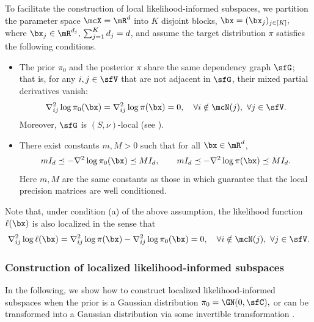 \documentclass[11pt]{article}
\begin{document}
\begin{asm}
\label{asm:LLIS}
To facilitate the construction of local likelihood-informed subspaces, we partition the parameter space $\mcX = \mR^d$ into $K$ disjoint blocks, $\bx = (\bx_j)_{j\in[K]},$ where $\bx_j \in \mR^{d_j},\, \sum_{j=1}^K d_j = d$,
and assume the target distribution $\pi$ satisfies the following conditions.
\begin{itemize}
    \item The prior $\pi_0$ and the posterior $\pi$ share the same dependency graph $\sfG$; that is, for any $i,j\in\sfV$ that are not adjacent in $\sfG$, their mixed partial derivatives vanish:
    \begin{equation}
        \nabla_{ij}^2 \log \pi_0 (\bx) = \nabla_{ij}^2 \log \pi (\bx) = 0, \quad \forall i \notin \mcN(j),~ \forall j \in \sfV.
    \end{equation}
    Moreover, $\sfG$ is $(S,\nu)$-local (see ).
    \item There exist constants $m,M > 0$ such that for all $\bx \in \mR^d$,
    \begin{equation}
        m I_d \preceq - \nabla^2 \log \pi_0(\bx) \preceq M I_d, \qquad m I_d \preceq - \nabla^2 \log \pi(\bx) \preceq M I_d.
    \end{equation}
    Here $m,M$ are the same constants as those in  which guarantee that the local precision matrices are well conditioned.
\end{itemize}
\end{asm}


Note that, under condition (a) of the above assumption, the likelihood function $\ell(\bx)$ is also localized in the sense that
\begin{equation}
    \nabla_{ij}^2 \log \ell(\bx) = \nabla_{ij}^2 \log \pi(\bx) - \nabla_{ij}^2 \log \pi_0(\bx) = 0, \quad \forall i \notin \mcN(j),~ \forall j \in \sfV.
\end{equation}




\subsubsection{Construction of localized likelihood-informed subspaces} 
\label{sec:LLIS_construct}

In the following, we show how to construct localized likelihood-informed subspaces when the prior is a Gaussian distribution
\(
    \pi_0 = \GN(0,\sfC),
\)
or can be transformed into a Gaussian distribution via some invertible transformation \cite{MR4500900}.
%
%
\end{document}
